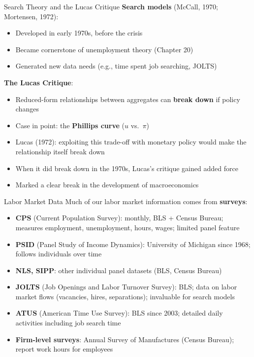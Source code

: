 \documentclass[blue]{beamer}
\begin{document}
\begin{frame}{Search Theory and the Lucas Critique}
	\textbf{Search models} (McCall, 1970; Mortensen, 1972):
		\vspace{-6pt}
	\begin{itemize}
		\item Developed in early 1970s, before the crisis
		\item Became cornerstone of unemployment theory (Chapter 20)
		\item Generated new data needs (e.g., time spent job searching, JOLTS)
	\end{itemize}

	\textbf{The Lucas Critique}:
		\vspace{-6pt}
	\begin{itemize}
		\item Reduced-form relationships between aggregates can \textbf{break down} if policy changes
		\item Case in point: the \textbf{Phillips curve} ($u$ vs.\ $\pi$)
		\item Lucas (1972): exploiting this trade-off with monetary policy would make the relationship itself break down
		\item When it did break down in the 1970s, Lucas's critique gained added force
		\item Marked a clear break in the development of macroeconomics
	\end{itemize}
\end{frame}

\begin{frame}{Labor Market Data}
	Much of our labor market information comes from \textbf{surveys}:
	\vspace{-6pt}
	\begin{itemize}
		\item \textbf{CPS} (Current Population Survey): monthly, BLS + Census Bureau; measures employment, unemployment, hours, wages; limited panel feature
		\item \textbf{PSID} (Panel Study of Income Dynamics): University of Michigan since 1968; follows individuals over time
		\item \textbf{NLS, SIPP}: other individual panel datasets (BLS, Census Bureau)
		\item \textbf{JOLTS} (Job Openings and Labor Turnover Survey): BLS; data on labor market flows (vacancies, hires, separations); invaluable for search models
		\item \textbf{ATUS} (American Time Use Survey): BLS since 2003; detailed daily activities including job search time
		\item \textbf{Firm-level surveys}: Annual Survey of Manufactures (Census Bureau); report work hours for employees
	\end{itemize}
\end{frame}
\end{document}
